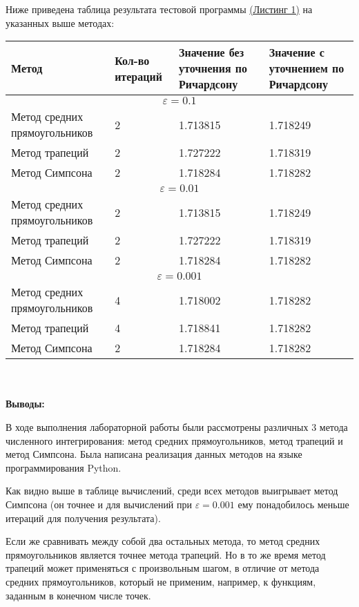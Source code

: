 \documentclass[a4paper, 12pt]{article}   	%
\begin{document}
Ниже приведена таблица результата тестовой программы \hyperlink{lst:quad}{(Листинг 1)} на указанных выше методах:
\begin{table}[h]
\begin{center}
\begin{tabular}{|P{4cm}|P{2.5cm}|P{4cm}|P{4cm}|}
\hline
Метод & Кол-во итераций & Значение без уточнения по Ричардсону & Значение с уточнением по Ричардсону \\
\hline
{} \\
\hline
Метод средних прямоугольников & 2 & 1.713815 & 1.718249 \\
\hline
Метод трапеций & 2 & 1.727222 & 1.718319 \\
\hline
Метод Симпсона & 2 & 1.718284 & 1.718282 \\
\hline
{} \\
\hline
Метод средних прямоугольников & 2 & 1.713815 & 1.718249 \\
\hline
Метод трапеций & 2 & 1.727222 & 1.718319 \\
\hline
Метод Симпсона & 2 & 1.718284 & 1.718282 \\
\hline
{} \\
\hline
Метод средних прямоугольников & 4 & 1.718002 & 1.718282 \\
\hline
Метод трапеций & 4 & 1.718841 & 1.718282 \\
\hline
Метод Симпсона & 2 & 1.718284 & 1.718282 \\
\hline
\end{tabular}
\end{center}
\end{table}
\\\\


\textbf{Выводы:}

В ходе выполнения лабораторной работы были рассмотрены различных 3 метода численного интегрирования: метод средних прямоугольников, метод трапеций и метод Симпсона. Была написана реализация данных методов на языке программирования Python.

Как видно выше в таблице вычислений, среди всех методов выигрывает метод Симпсона (он точнее и для вычислений при $\varepsilon = 0.001$ ему понадобилось меньше итераций для получения результата).

Если же сравнивать между собой два остальных метода, то метод средних прямоугольников является точнее метода трапеций. Но в то же время метод трапеций может применяться с произвольным шагом, в отличие от метода средних прямоугольников, который не применим, например, к функциям, заданным в конечном числе точек.




 
 
 
 
 
 
 \enddocument
\end{document}
